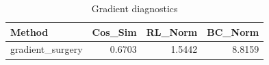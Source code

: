 \begin{table}[htbp]
\centering
\caption{Gradient diagnostics}
\label{tab:grad-diag}
\begin{tabular}{lrrr}
\toprule
\textbf{Method} & \textbf{Cos\_Sim} & \textbf{RL\_Norm} & \textbf{BC\_Norm} \\
\midrule
gradient\_surgery & 0.6703 & 1.5442 & 8.8159 \\
\bottomrule
\end{tabular}
\end{table}